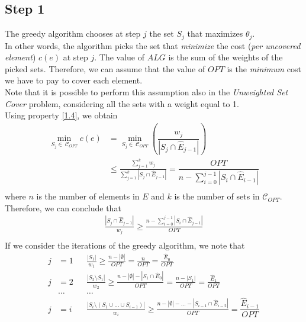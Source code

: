 \documentclass[a4paper,11pt]{article}
\begin{document}
\subsection{Step 1}
The greedy algorithm chooses at step $j$ the set $S_{j}$ that maximizes $\theta_{j}$. \\
In other words, the algorithm picks the set that \textit{minimize} the cost (\textit{per uncovered element}) $c(e)$ at step $j$. The value of $ALG$ is the sum of the weights of the picked sets. Therefore, we can assume that the value of $OPT$ is the \textit{minimum} cost we have to pay to cover each element. \\ 
Note that it is possible to perform this assumption also in the \textit{Unweighted Set Cover} problem, considering all the sets with a weight equal to 1. \\
Using property \ref{1.4}, we obtain
\begin{align*}
\min_{S_{j} \in \ \mathcal{C}_{OPT}} c(e) &= \min_{S_{j} \in \ \mathcal{C}_{OPT}} \left( \dfrac{w_{j}}{\left| S_{j} \cap \hat{E}_{j-1} \right|} \right) \\ 
&\le \frac{\sum\limits_{j = 1}^{k}w_{j}}{\sum\limits_{j = 1}^{k}\left| S_{j} \cap \hat{E}_{j-1} \right|} =  \dfrac{OPT}{n-\sum\limits_{i=0}^{j-1}\left| S_{i} \cap \hat{E}_{i-1} \right|}\\
\nonumber
\end{align*}
where $n$ is the number of elements in $E$ and $k$ is the number of sets in $\mathcal{C}_{OPT}$. Therefore, we can conclude that 
\begin{align*}
\frac{\left| S_{j} \cap \hat{E}_{j-1} \right|}{w_{j}} \ge \frac{n-\sum\limits_{i=0}^{j-1} \left| S_{i} \cap \hat{E}_{j-1} \right|}{OPT}\\
\nonumber
\end{align*}
If we consider the iterations of the greedy algorithm, we note that
\begin{align*}
j &= 1 & &\frac{\left|S_{1}\right|}{w_{1}} \ge \frac{n-\left| \emptyset \right|}{OPT} = \frac{n}{OPT} = \frac{\hat{E}_{0}}{OPT}\\ 
j &= 2 & &\frac{\left|S_{2} \setminus S_{1} \right|}{w_{2}} \ge \frac{n-\left| \emptyset \right|-\left| S_{1}\cap \hat{E}_{0} \right|}{OPT} = \frac{n - \left| S_{1} \right|}{OPT} = \frac{\hat{E}_{1}}{OPT}\\
&\ldots & &\ldots \\
j &= i & &\frac{\left| S_{i} \setminus \left( S_{1} \cup \dots \cup S_{i-1} \right) \right|}{w_{i}} \ge \frac{n-\left| \emptyset \right|- \dots - \left| S_{i-1} \cap \hat{E}_{i-2} \right|}{OPT} = \dfrac{\hat{E}_{i-1}}{OPT}\\
\end{align*}
\end{document}

